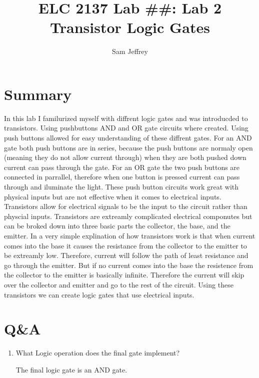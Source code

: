 \documentclass[11pt]{article}
\begin{document}
\title{ELC 2137 Lab \#\#: Lab 2 Transistor Logic Gates}
\author{Sam Jeffrey}

\maketitle


\section*{Summary}

In this lab I familurized myself with diffrent logic gates and was introducded to transistors. Using pushbuttons AND and OR gate circuits where created. Using push buttons allowed for easy understanding of these diffrent gates. For an AND gate both push buttons are in series, because the push buttons are normaly open (meaning they do not allow current through) when they are both pushed down current can pass through the gate. For an OR gate the two push buttons are connected in parrallel, therefore when one button is pressed current can pass through and iluminate the light. These push button circuits work great with physical inputs but are not effective when it comes to electrical inputs. Transistors allow for electrical signals to be the input to the circuit rather than physcial inputs. Transistors are extreamly complicated electrical componutes but can be broked down into three basic parts the collector, the base, and the emitter. In a very simple explination of how transistors work is that when current comes into the base it causes the resistance from the collector to the emitter to be extreamly low. Therefore, current will follow the path of least resistance and go through the emitter. But if no current comes into the base the resistence from the collector to the emitter is basically infinite. Therefore the current will skip over the collector and emitter and go to the rest of the circuit. Using these transistors we can create logic gates that use electrical inputs. 


\section*{Q\&A}

\begin{enumerate}
	\item What Logic operation does the final gate implement?
	
	The final logic gate is an AND gate.
\end{enumerate}
\end{document}
